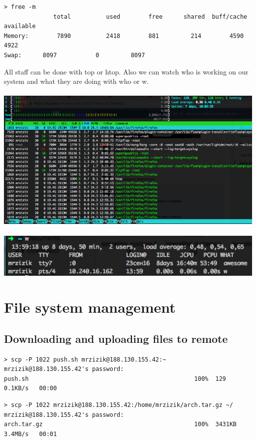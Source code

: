 \documentclass[10pt]{article}
\begin{document}
\begin{verbatim}
> free -m
              total          used        free      shared  buff/cache   available
Memory:        7890          2418        881         214        4590        4922
Swap:      8097           0         8097
\end{verbatim}
All staff can be done with top or htop. Also we can watch who is working on our system and what they are doing with who or w. \\ \\
\includegraphics[width=\textwidth, scale=0.5]{htop}\\ \\
\includegraphics[width=\textwidth, scale=0.5]{w}



\section{File system management}
\subsection{Downloading and uploading files to remote}
\begin{verbatim}
> scp -P 1022 push.sh mrzizik@188.130.155.42:~
mrzizik@188.130.155.42's password:
push.sh                                               100%  129     0.1KB/s   00:00
\end{verbatim}
\begin{verbatim}
> scp -P 1022 mrzizik@188.130.155.42:/home/mrzizik/arch.tar.gz ~/
mrzizik@188.130.155.42's password: 
arch.tar.gz                                           100%  3431KB     3.4MB/s   00:01
\end{verbatim}
\end{document}
